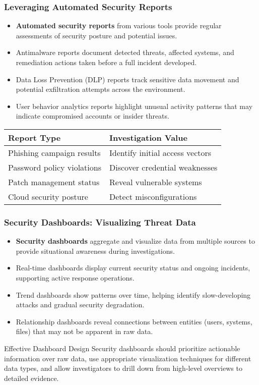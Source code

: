 \documentclass{beamer}
\begin{document}
\begin{frame}
\frametitle{Leveraging Automated Security Reports}
\begin{itemize}
\item \textbf{Automated security reports} from various tools provide regular assessments of security posture and potential issues.
\item Antimalware reports document detected threats, affected systems, and remediation actions taken before a full incident developed.
\item Data Loss Prevention (DLP) reports track sensitive data movement and potential exfiltration attempts across the environment.
\item User behavior analytics reports highlight unusual activity patterns that may indicate compromised accounts or insider threats.
\end{itemize}

\begin{center}
\scriptsize
\begin{tabular}{|l|l|}
\hline
\textbf{Report Type} & \textbf{Investigation Value} \\
\hline
Phishing campaign results & Identify initial access vectors \\
Password policy violations & Discover credential weaknesses \\
Patch management status & Reveal vulnerable systems \\
Cloud security posture & Detect misconfigurations \\
\hline
\end{tabular}
\end{center}
\end{frame}

\begin{frame}
\frametitle{Security Dashboards: Visualizing Threat Data}
\begin{itemize}
\item \textbf{Security dashboards} aggregate and visualize data from multiple sources to provide situational awareness during investigations.
\item Real-time dashboards display current security status and ongoing incidents, supporting active response operations.
\item Trend dashboards show patterns over time, helping identify slow-developing attacks and gradual security degradation.
\item Relationship dashboards reveal connections between entities (users, systems, files) that may not be apparent in raw data.
\end{itemize}

\begin{block}{Effective Dashboard Design}
Security dashboards should prioritize actionable information over raw data, use appropriate visualization techniques for different data types, and allow investigators to drill down from high-level overviews to detailed evidence.
\end{block}
\end{frame}
\end{document}
